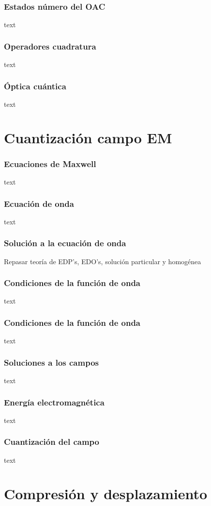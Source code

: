 \documentclass[xcolor=dvipsnames,slidestop,compress,mathserif, 11pt]{beamer}
\begin{document}
\begin{frame}[c]
	\frametitle{Estados número del OAC}
	text
\end{frame}

\begin{frame}[c]
	\frametitle{Operadores cuadratura}
	text
\end{frame}

\begin{frame}[c]
	\frametitle{Óptica cuántica}
	text
\end{frame}

\section{Cuantización campo EM}

\begin{frame}[c]
	\frametitle{Ecuaciones de Maxwell}
	text
\end{frame}

\begin{frame}[c]
	\frametitle{Ecuación de onda}
	text
\end{frame}

\begin{frame}[c]
	\frametitle{Solución a la ecuación de onda}
	Repasar teoría de EDP's, EDO's, solución particular y homogénea
\end{frame}

\begin{frame}[c]
	\frametitle{Condiciones de la función de onda}
	text
\end{frame}

\begin{frame}[c]
	\frametitle{Condiciones de la función de onda}
	text
\end{frame}

\begin{frame}[c]
	\frametitle{Soluciones a los campos}
	text
\end{frame}

\begin{frame}[c]
	\frametitle{Energía electromagnética}
	text
\end{frame}

\begin{frame}[c]
	\frametitle{Cuantización del campo}
	text
\end{frame}

\section{Compresión y desplazamiento}
\end{document}

